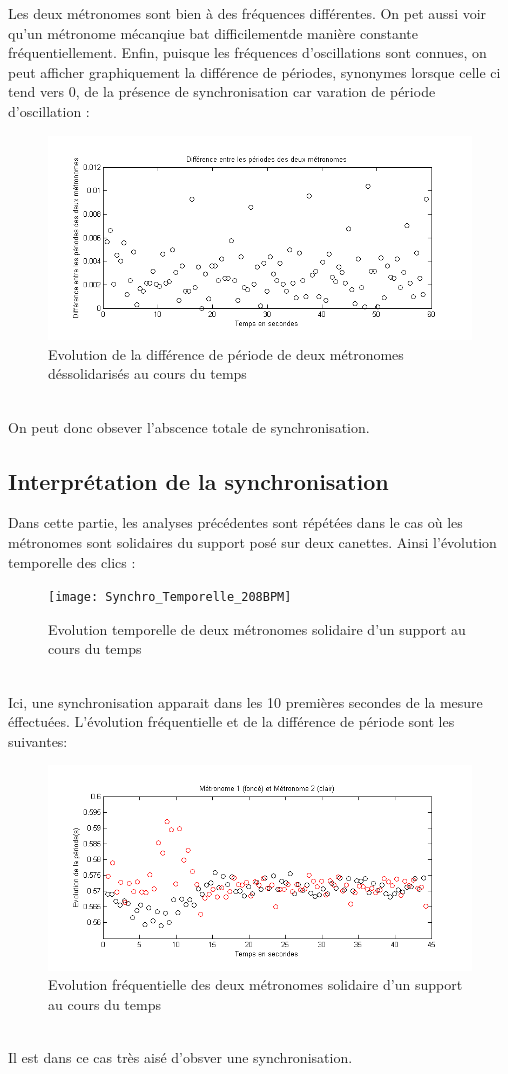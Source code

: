 \documentclass[a4paper,11pt]{report}
\begin{document}
Les deux métronomes sont bien à des fréquences différentes. On pet aussi voir qu'un métronome mécanqiue bat difficilementde manière constante fréquentiellement.
Enfin, puisque les fréquences d'oscillations sont connues, on peut afficher graphiquement la différence de périodes, synonymes lorsque celle ci tend vers 0, de la présence de synchronisation car varation de période d'oscillation :
\begin{figure}[h]
\centering
\includegraphics[width=1\textwidth]{Caracterisation_Periode_200BPM}
\caption{Evolution de la différence de période de deux métronomes déssolidarisés au cours du temps}\label{CaractérisationP}
\end{figure}\\
On peut donc obsever l'abscence totale de synchronisation.
\subsection{Interprétation de la synchronisation}
Dans cette partie, les analyses précédentes sont répétées dans le cas où les métronomes sont solidaires du support posé sur deux canettes. Ainsi l'évolution temporelle des clics :
\begin{figure}[h]
\centering
\texttt{[image: Synchro\_Temporelle\_208BPM]}
\caption{Evolution temporelle de deux métronomes solidaire d'un support au cours du temps}\label{SynchronisationT}
\end{figure}\\
Ici, une synchronisation apparait dans les 10 premières secondes de la mesure éffectuées.
L'évolution fréquentielle et de la différence de période sont les suivantes:
\begin{figure}[h]
\centering
\includegraphics[width=1\textwidth]{Synchro_Frequence_208BPM}
\caption{Evolution fréquentielle des deux métronomes solidaire d'un support au cours du temps}\label{Synchronisation}
\end{figure}\\
Il est dans ce cas très aisé d'obsver une synchronisation.
\end{document}
